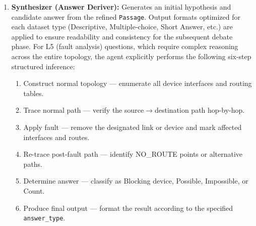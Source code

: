\begin{enumerate}
\item \textbf{Synthesizer (Answer Deriver):}
  Generates an initial hypothesis and candidate answer from the refined \texttt{Passage}.
  Output formats optimized for each dataset type (Descriptive, Multiple-choice, Short Answer, etc.) are applied to ensure readability and consistency for the subsequent debate phase.
  For L5 (fault analysis) questions, which require complex reasoning across the entire topology, the agent explicitly performs the following six-step structured inference:
  \begin{enumerate}
    \item Construct normal topology --- enumerate all device interfaces and routing tables.
    \item Trace normal path --- verify the source$\rightarrow$destination path hop-by-hop.
    \item Apply fault --- remove the designated link or device and mark affected interfaces and routes.
    \item Re-trace post-fault path --- identify NO\_ROUTE points or alternative paths.
    \item Determine answer --- classify as Blocking device, Possible, Impossible, or Count.
    \item Produce final output --- format the result according to the specified \texttt{answer\_type}.
  \end{enumerate}



\end{enumerate}

